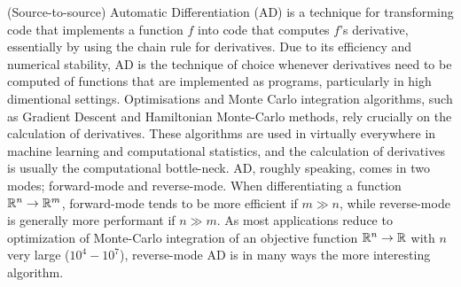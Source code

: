 (Source-to-source) Automatic Differentiation (AD) is a technique for transforming code that implements 
a function $f$ into code that computes $f$'s derivative, essentially by using the chain rule for derivatives. 
Due to its efficiency and numerical stability, AD is the technique of choice whenever derivatives need to be computed 
of functions that are implemented as programs, particularly in high dimentional settings. 
Optimisations and Monte Carlo integration algorithms, such as Gradient Descent and Hamiltonian Monte-Carlo methods, 
rely crucially on the calculation of derivatives. These algorithms are used in virtually everywhere in machine learning 
and computational statistics, and the calculation of derivatives is usually the computational bottle-neck. 
AD, roughly speaking, comes in two modes; forward-mode and reverse-mode. 
When differentiating a function $\mathbb{R}^n\to\mathbb{R}^m$, forward-mode tends to be more efficient if $m \gg n$, while reverse-mode 
is generally more performant if $n \gg m$. As most applications reduce to optimization of Monte-Carlo 
integration of an objective function $\mathbb{R}^n\to\mathbb{R}$ with $n$ very large ($10^4-10^7$), reverse-mode AD is 
in many ways the more interesting algorithm.

